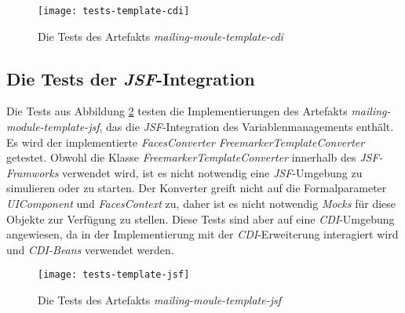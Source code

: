 \begin{figure}[h]
\centering
\texttt{[image: tests-template-cdi]}
\caption{Die Tests des Artefakts \emph{mailing-moule-template-cdi}}
\label{fig:tests-template-cdi}
\end{figure}

\subsection{Die Tests der \emph{JSF}-Integration}
Die Tests aus Abbildung \ref{fig:tests-template-jsf} testen die Implementierungen des Artefakts \emph{mailing-module-template-jsf}, das die \emph{JSF}-Integration des Variablenmanagements enthält. Es wird der implementierte \emph{FacesConverter FreemarkerTemplateConverter} getestet. Obwohl die Klasse \emph{FreemarkerTemplateConverter} innerhalb des \emph{JSF-Framworks} verwendet wird, ist es nicht notwendig eine \emph{JSF}-Umgebung zu simulieren oder zu starten. Der Konverter greift nicht auf die Formalparameter \emph{UIComponent} und \emph{FacesContext} zu, daher ist es nicht notwendig \emph{Mocks} für diese Objekte zur Verfügung zu stellen. Diese Tests sind aber auf eine \emph{CDI}-Umgebung angewiesen, da in der Implementierung mit der \emph{CDI}-Erweiterung interagiert wird und \emph{CDI-Beans} verwendet werden.

\begin{figure}[h]
\centering
\texttt{[image: tests-template-jsf]}
\caption{Die Tests des Artefakts \emph{mailing-moule-template-jsf}}
\label{fig:tests-template-jsf}
\end{figure}

